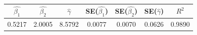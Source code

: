\begin{tabular}{ccccccc}
\toprule
$\hat{\beta_1}$ & $\hat{\beta_2}$ & $\hat{\gamma}$ & SE($\hat{\beta_1}$) & SE($\hat{\beta_2}$) & SE($\hat{\gamma}$) & $R^2$ \\
\midrule
0.5217 & 2.0005 & 8.5792 & 0.0077 & 0.0070 & 0.0626 & 0.9890 \\
\bottomrule
\end{tabular}